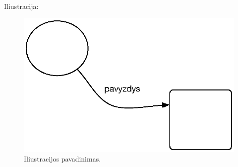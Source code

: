 \par Iliustracija:

\begin{figure}[H]
  \centering
  \includegraphics[scale=0.4]{assets/diagram.eps}
  \caption{Iliustracijos pavadinimas.}
\end{figure}
